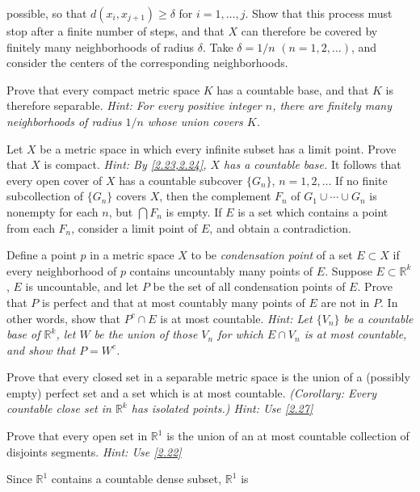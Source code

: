 \begin{exercise}
  possible, so that \(d(x_i, x_{j + 1})\geq\delta\) for \(i = 1,\ldots,j\).
  Show that this process must stop after a finite number of steps, and that
  \(X\) can therefore be covered by finitely many neighborhoods of radius
  \(\delta\).
  Take \(\delta = 1/n\) \((n = 1,2,\ldots)\), and consider the centers of the
  corresponding neighborhoods.
\item
  Prove that every compact metric space \(K\) has a countable base, and that
  \(K\) is therefore separable.
  \textit{Hint: For every positive integer \(n\), there are finitely many
    neighborhoods of radius \(1/n\) whose union covers \(K\).}
\item
  Let \(X\) be a metric space in which every infinite subset has a limit point.
  Prove that \(X\) is compact.
  \textit{Hint: By \cref{2.23,2.24}, \(X\) has a countable base.}
  It follows that every open cover of \(X\) has a countable subcover
  \(\{G_n\}\), \(n = 1,2,\ldots\)
  If no finite subcollection of \(\{G_n\}\) covers \(X\), then the complement
  \(F_n\) of \(G_1\cup\cdots\cup G_n\) is nonempty for each \(n\), but
  \(\bigcap F_n\) is empty.
  If \(E\) is a set which contains a point from each \(F_n\), consider a limit
  point of \(E\), and obtain a contradiction.
\item
  \label{2.27}
  Define a point \(p\) in a metric space \(X\) to be
  \textit{condensation point} of a set \(E\subset X\) if every neighborhood of
  \(p\) contains uncountably many points of \(E\).
  Suppose \(E\subset\mathbb{R}^k\), \(E\) is uncountable, and let \(P\) be the
  set of all condensation points of \(E\).
  Prove that \(P\) is perfect and that at most countably many points of \(E\)
  are not in \(P\).
  In other words, show that \(P^c\cap E\) is at most countable.
  \textit{Hint: Let \(\{V_n\}\) be a countable base of \(\mathbb{R}^k\), let
    \(W\) be the union of those \(V_n\) for which \(E\cap V_n\) is at most
    countable, and show that \(P = W^c\).}
\item
  Prove that every closed set in a separable metric space is the union of a
  (possibly empty) perfect set and a set which is at most countable.
  \textit{(Corollary: Every countable close set in \(\mathbb{R}^k\) has
    isolated points.)
    Hint: Use \cref{2.27}}
\item
  \label{2.29}
  Prove that every open set in \(\mathbb{R}^1\) is the union of an at most
  countable collection of disjoints segments.
  \textit{Hint: Use \cref{2.22}}
  \par\smallskip
  Since \(\mathbb{R}^1\) contains a countable dense subset, \(\mathbb{R}^1\) is

\end{exercise}
